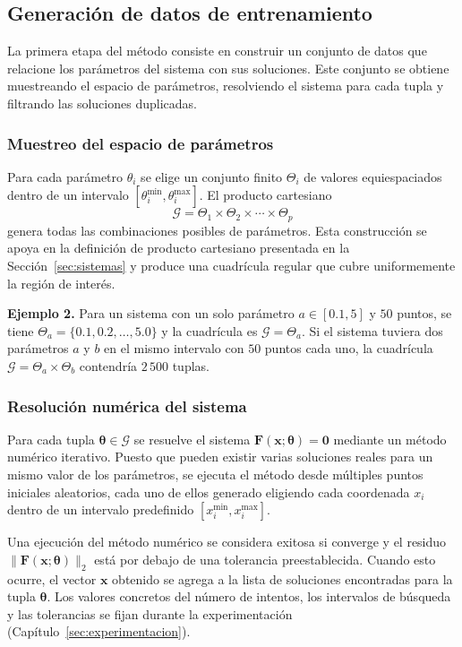 \documentclass[12pt,a4paper]{article} \usepackage[utf8]{inputenc} \usepackage[spanish]{babel} \usepackage{amsmath, amssymb, amsthm} \usepackage{bm} \usepackage{float} \usepackage{longtable} \usepackage[hidelinks]{hyperref}
\newcommand{\xvec}{\mathbf{x}} \newcommand{\thetavec}{\boldsymbol{\theta}} \newcommand{\Fvec}{\mathbf{F}} \newcommand{\R}{\mathbb{R}} \newcommand{\norm}[1]{\left\lVert#1\right\rVert} \newcommand{\loss}{\mathcal{L}} \newcommand{\dataset}{\mathcal{D}} \newcommand{\jac}{\mathbf{J}}
\begin{document}
\subsection{Generación de datos de entrenamiento}
\label{sec:generacion_datos}

La primera etapa del método consiste en construir un conjunto de datos
que relacione los parámetros del sistema con sus soluciones. Este
conjunto se obtiene muestreando el espacio de parámetros, resolviendo
el sistema para cada tupla y filtrando las soluciones duplicadas.

\subsubsection{Muestreo del espacio de parámetros}

Para cada parámetro \(\theta_i\) se elige un conjunto finito
\(\Theta_i\) de valores equiespaciados dentro de un intervalo
\([\theta_i^{\min}, \theta_i^{\max}]\). El producto cartesiano
\[
\mathcal{G} = \Theta_1 \times \Theta_2 \times \cdots \times \Theta_p
\]
genera todas las combinaciones posibles de parámetros. Esta
construcción se apoya en la definición de producto cartesiano
presentada en la Sección~\ref{sec:sistemas} y produce una cuadrícula
regular que cubre uniformemente la región de interés.

\bigskip
\noindent\textbf{Ejemplo 2.} Para un sistema con un solo parámetro
\(a \in [0.1, 5]\) y \(50\) puntos, se tiene
\(\Theta_a = \{0.1, 0.2, \dots, 5.0\}\) y la cuadrícula es
\(\mathcal{G} = \Theta_a\). Si el sistema tuviera dos parámetros
\(a\) y \(b\) en el mismo intervalo con \(50\) puntos cada uno, la
cuadrícula \(\mathcal{G} = \Theta_a \times \Theta_b\) contendría
\(2\,500\) tuplas.

\subsubsection{Resolución numérica del sistema}

Para cada tupla \(\thetavec \in \mathcal{G}\) se resuelve el sistema
\(\Fvec(\xvec; \thetavec) = \mathbf{0}\) mediante un método numérico
iterativo. Puesto que pueden existir varias soluciones reales para un
mismo valor de los parámetros, se ejecuta el método desde múltiples
puntos iniciales aleatorios, cada uno de ellos generado eligiendo
cada coordenada \(x_i\) dentro de un intervalo predefinido
\([x_i^{\min}, x_i^{\max}]\).

Una ejecución del método numérico se considera exitosa si converge y
el residuo \(\|\Fvec(\xvec; \thetavec)\|_2\) está por debajo de una
tolerancia preestablecida. Cuando esto ocurre, el vector \(\xvec\)
obtenido se agrega a la lista de soluciones encontradas para la tupla
\(\thetavec\). Los valores concretos del número de intentos, los
intervalos de búsqueda y las tolerancias se fijan durante la
experimentación (Capítulo~\ref{sec:experimentacion}).
\end{document}
